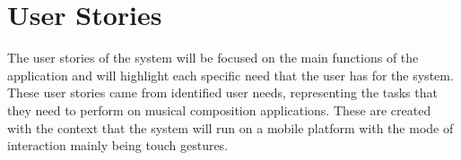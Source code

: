 \begin{comment}
\chapter{Resource Persons}
\label{sec:appendixf}

\newcommand{\resperson}[4]{\textbf{#1} \\ #2 \\ #3 \\ \url{#4}\vspace{0.5em}\\}

\resperson{Mr. Jordan Aiko Deja}{Adviser}{College of Computer Studies\\De La Salle University-Manila}{jordan.deja@dlsu.edu.ph}
\\
\resperson{Dr. Rafael Cabredo}{Chair, Software Technology Department}{College of Computer Studies\\De La Salle University-Manila}{rafael.cabredo@dlsu.edu.ph}

\end{comment}

\chapter{User Stories}
  The user stories of the system will be focused on the main functions of the application and will highlight each specific need that the user has for the system. These user stories came from identified user needs, representing the tasks that they need to perform on musical composition applications. These are created with the context that the system will run on a mobile platform with the mode of interaction mainly being touch gestures. 

